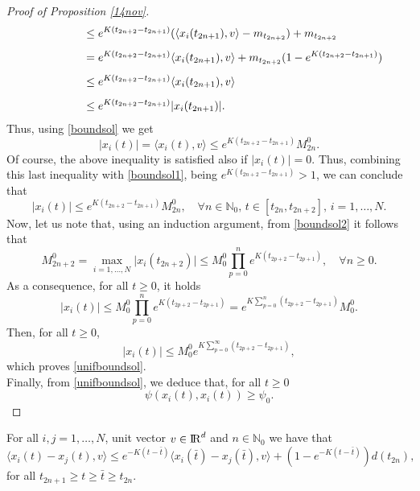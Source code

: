 \documentclass[a4paper,11pt,oneside]{article}
\newcommand{\RR}{{{\rm I} \kern -.15em {\rm R} }}
\begin{document}
\begin{proof}[Proof of Proposition \ref{14nov}]
$$\begin{array}{l}
	\vspace{0.3cm}\displaystyle{\hspace{1.6cm}\leq e^{K(t_{2n+2}-t_{2n+1})}(\langle  x_{i}(t_{2n+1}),v\rangle-m_{t_{2n+2}})+m_{t_{2n+2}}}\\
	\vspace{0.3cm}\displaystyle{\hspace{1.6cm}=e^{K(t_{2n+2}-t_{2n+1})}\langle  x_{i}(t_{2n+1}),v\rangle+m_{t_{2n+2}}(1-e^{K(t_{2n+2}-t_{2n+1})})}\\
	\vspace{0.3cm}\displaystyle{\hspace{1.6cm}\leq e^{K(t_{2n+2}-t_{2n+1})}\langle  x_{i}(t_{2n+1}),v\rangle}\\
	\displaystyle{\hspace{1.6cm}\leq e^{K(t_{2n+2}-t_{2n+1})}  \lvert x_{i}(t_{2n+1})\rvert.}
\end{array}$$
Thus, using \eqref{boundsol} we get $$\lvert x_{i}(t)\rvert=\langle  x_{i}(t),v\rangle\leq e^{K(t_{2n+2}-t_{2n+1})}M^{0}_{2n}.$$
Of course, the above inequality is satisfied also if $\lvert x_{i}(t)\rvert=0$. Thus,  combining this last inequality with \eqref{boundsol1}, being $e^{K(t_{2n+2}-t_{2n+1})}>1$, we can conclude that
\begin{equation}\label{boundsol2}
	\lvert x_{i}(t)\rvert\leq e^{K(t_{2n+2}-t_{2n+1})}M^{0}_{2n},\quad \forall n\in \mathbb{N}_{0},\, t\in [t_{2n},t_{2n+2}],\,i=1,\dots,N.
\end{equation}
Now, let us note that, using an induction argument, from \eqref{boundsol2} it follows that
$$M^{0}_{2n+2}=\max_{i=1,\dots,N}\lvert x_{i}(t_{2n+2})\rvert\leq M^{0}_{0}\prod_{p=0}^{n}e^{K(t_{2p+2}-t_{2p+1})},\quad \forall n\geq 0.$$
As a consequence, for all $t\geq 0$, it holds
$$\lvert x_{i}(t)\rvert\leq M^{0}_{0}\prod_{p=0}^{n}e^{K(t_{2p+2}-t_{2p+1})}=e^{K\sum_{p=0}^{n}(t_{2p+2}-t_{2p+1})}M^{0}_{0}.$$
Then, for all $t\geq 0$, $$\lvert x_{i}(t)\rvert\leq M^{0}_{0}e^{K\sum_{p=0}^{\infty}(t_{2p+2}-t_{2p+1})},$$
which proves \eqref{unifboundsol}.
\\Finally, from \eqref{unifboundsol}, we deduce that, for all $t\geq 0$
$$\psi(x_{i}(t),x_{i}(t))\geq \psi_{0}.$$
\end{proof}	
\begin{prop}\label{L4}
		For all $i,j=1,\dots,N$,  unit vector $v\in \RR^{d}$ and $n\in\mathbb{N}_{0}$ we have that 
		\begin{equation}\label{4}
			\langle x_{i}(t)-x_{j}(t),v\rangle\leq e^{-K(t-\bar{t})}\langle x_{i}(\bar{t})-x_{j}(\bar{t}),v\rangle+(1-e^{-K(t-\bar{t})})d(t_{2n}),
		\end{equation}
		for all $t_{2n+1}\geq t\geq \bar{t}\geq t_{2n}$. 
	\end{prop}
\end{document}

